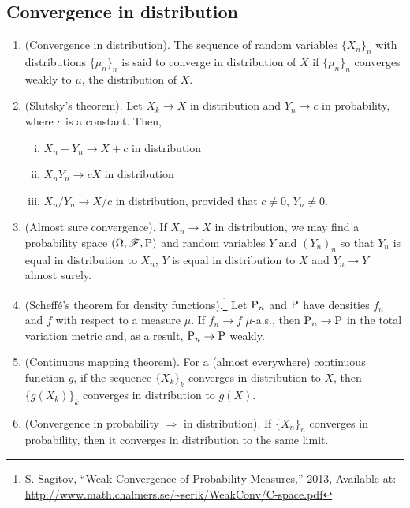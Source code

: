 \documentclass[a4paper,10pt]{article}
\begin{document}
\subsection{Convergence in distribution}
\begin{enumerate}
\item (Convergence in distribution). The sequence of random variables $\{X_n\}_n$ with distributions 
      $\{\mu_n\}_n$ is said to converge in distribution of $X$ if $\{\mu_n\}_n$ converges weakly
      to $\mu$, the distribution of $X$.
      
\item (Slutsky's theorem). Let $X_k\to X$ in distribution and $Y_n\to c$ in probability, where $c$ is a constant.
      Then, 
      \begin{enumerate}[i.]
       \item $X_n + Y_n \to X + c$ in distribution
       \item $X_nY_n \to cX$ in distribution
       \item $X_n/Y_n \to X/c$ in distribution, provided that $c\neq 0$, $Y_n\neq 0$.
      \end{enumerate}
      
\item (Almost sure convergence). If $X_n\to X$ in distribution, we may find a probability space $(\Omega,\mathscr{F},\mathrm{P})$
      and random variables $Y$ and $(Y_n)_n$ so that $Y_n$ is equal in distribution to $X_n$,
      $Y$ is equal in distribution to $X$ and $Y_n\to Y$ almost surely.
      
\item (Scheff\'e's theorem for density functions).\footnote{S. Sagitov, ``Weak Convergence of Probability Measures,'' 2013, Available at: \url{http://www.math.chalmers.se/~serik/WeakConv/C-space.pdf}}
Let $\mathrm{P}_n$ and $\mathrm{P}$ have densities $f_n$ and $f$
      with respect to a measure $\mu$. If $f_n \to f$ $\mu$-a.s., then $\mathrm{P}_n \to \mathrm{P}$ in the total 
      variation metric and, as a result,  $\mathrm{P}_n \to \mathrm{P}$ weakly.
      
\item (Continuous mapping theorem). For a (almost everywhere) continuous function $g$, if the sequence $\{X_k\}_k$ 
      converges in distribution to $X$, then $\{g(X_k)\}_k$ converges in distribution to 
      $g(X)$.
      
\item (Convergence in probability $\Rightarrow$ in distribution). If $\{X_n\}_n$ converges in probability,
      then it converges in distribution to the same limit.
      

\end{enumerate}
\end{document}
